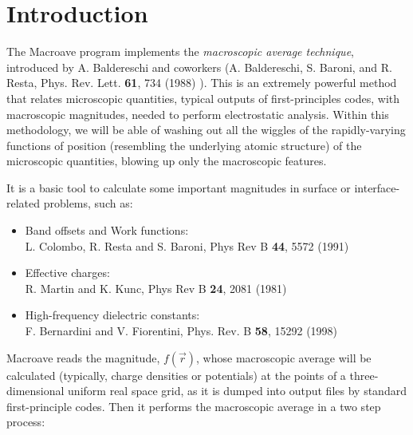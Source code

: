 \tableofcontents

\newpage



\section{Introduction}
\label{sec:intro}

 The {\sc Macroave} program implements 
 the {\it macroscopic average technique},
 introduced by A. Baldereschi and coworkers 
 (A. Baldereschi, S. Baroni, and R. Resta, 
 Phys. Rev. Lett. {\bf 61}, 734 (1988) ).
 This is an extremely powerful method that relates 
 microscopic quantities, typical outputs of first-principles codes, 
 with macroscopic magnitudes,
 needed to perform electrostatic analysis. 
 Within this methodology, we will be able of washing out all the 
 wiggles of the rapidly-varying functions of position (resembling
 the underlying atomic structure) of the microscopic quantities,
 blowing up only the macroscopic features. 

 It is a basic tool to calculate some important magnitudes in 
 surface or interface-related problems, such as:   

 \begin{itemize}
    \item Band offsets and Work functions: \\
          L. Colombo, R. Resta and S. Baroni, Phys Rev B  {\bf 44}, 5572 (1991)
    \item Effective charges: \\
          R. Martin and K. Kunc,  Phys Rev B  {\bf 24}, 2081 (1981)
    \item High-frequency dielectric constants: \\
          F. Bernardini and V. Fiorentini, Phys. Rev. B {\bf 58}, 15292 (1998)
 \end{itemize}

 {\sc Macroave} reads the magnitude, $f \left( \vec{r} \right)$,
 whose macroscopic average will be calculated
 (typically, charge densities or potentials)
 at the points of a three-dimensional uniform real space grid, 
 as it is dumped into output files by standard first-principle codes. 
 Then it performs the macroscopic average in a two step process:
 
